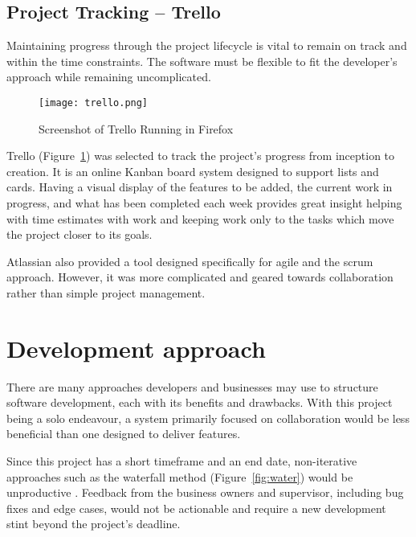 \subsection{Project Tracking -- Trello}
Maintaining progress through the project lifecycle is vital to remain on track and within the time constraints. The software must be flexible to fit the developer's approach while remaining uncomplicated.

\begin{figure}[ht!]
    \centerline{\texttt{[image: trello.png]}}
    \caption{Screenshot of Trello Running in Firefox}
    \label{fig:trello}
\end{figure}

Trello (Figure~\ref{fig:trello}) was selected to track the project's progress from inception to creation. It is an online Kanban board system designed to support lists and cards. Having a visual display of the features to be added, the current work in progress, and what has been completed each week provides great insight helping with time estimates with work and keeping work only to the tasks which move the project closer to its goals.

Atlassian also provided a tool designed specifically for agile and the scrum approach. However, it was more complicated and geared towards collaboration rather than simple project management.



\section{Development approach}
There are many approaches developers and businesses may use to structure software development, each with its benefits and drawbacks. With this project being a solo endeavour, a system primarily focused on collaboration would be less beneficial than one designed to deliver features.

Since this project has a short timeframe and an end date, non-iterative approaches such as the waterfall method (Figure~\ref{fig:water}) would be unproductive \parencite{mpcs_waterfall_2012}. Feedback from the business owners and supervisor, including bug fixes and edge cases, would not be actionable and require a new development stint beyond the project's deadline.

